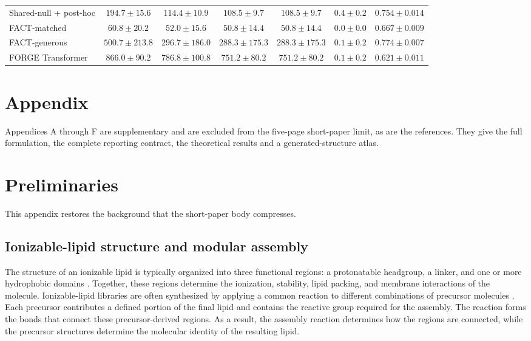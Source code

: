 \documentclass{article}
\begin{document}
\begin{table}[htbp]
\begin{tabular}{@{}>{\raggedright\arraybackslash}p{3.45cm}cccccc@{}}
Shared-null + post-hoc & $194.7\pm15.6$ & $114.4\pm10.9$ & $108.5\pm9.7$ & $108.5\pm9.7$ & $0.4\pm0.2$ & $0.754\pm0.014$ \\
FACT-matched & $60.8\pm20.2$ & $52.0\pm15.6$ & $50.8\pm14.4$ & $50.8\pm14.4$ & $0.0\pm0.0$ & $0.667\pm0.009$ \\
FACT-generous & $500.7\pm213.8$ & $296.7\pm186.0$ & $288.3\pm175.3$ & $288.3\pm175.3$ & $0.1\pm0.2$ & $0.774\pm0.007$ \\
FORGE Transformer & $866.0\pm90.2$ & $786.8\pm100.8$ & $751.2\pm80.2$ & $751.2\pm80.2$ & $0.1\pm0.2$ & $0.621\pm0.011$ \\%
\end{tabular}
\endgroup
\end{table}




\clearpage
\appendix

\section*{Appendix}

Appendices A through F are supplementary and are excluded from the five-page short-paper limit, as
are the references. They give the full formulation, the complete reporting contract, the theoretical
results and a generated-structure atlas.

\section{Preliminaries}
\label{app:preliminaries}

This appendix restores the background that the short-paper body compresses.

\subsection{Ionizable-lipid structure and modular assembly}

The structure of an ionizable lipid is typically organized into three functional regions: a
protonatable headgroup, a linker, and one or more hydrophobic domains
\citep{semple2010rational,jayaraman2012maximizing}.
Together, these regions determine the ionization, stability, lipid packing, and membrane
interactions of the molecule.
Ionizable-lipid libraries are often synthesized by applying a common reaction to different
combinations of precursor molecules
\citep{akinc2008combinatorial,love2010lipidlike,li2024accelerating,xu2024agile}.
Each precursor contributes a defined portion of the final lipid and contains the reactive group
required for the assembly.
The reaction forms the bonds that connect these precursor-derived regions.
As a result, the assembly reaction determines how the regions are connected, while the precursor
structures determine the molecular identity of the resulting lipid.
\end{document}
